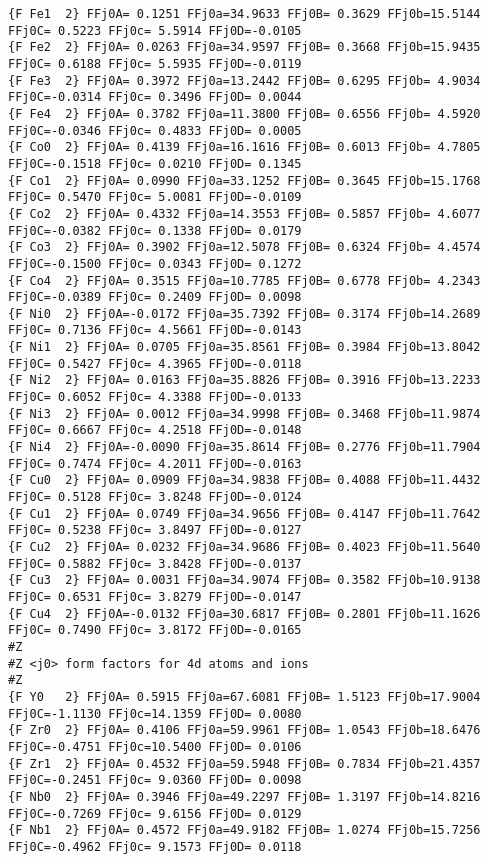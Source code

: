 {\begin{verbatim}
{F Fe1  2} FFj0A= 0.1251 FFj0a=34.9633 FFj0B= 0.3629 FFj0b=15.5144 FFj0C= 0.5223 FFj0c= 5.5914 FFj0D=-0.0105 
{F Fe2  2} FFj0A= 0.0263 FFj0a=34.9597 FFj0B= 0.3668 FFj0b=15.9435 FFj0C= 0.6188 FFj0c= 5.5935 FFj0D=-0.0119 
{F Fe3  2} FFj0A= 0.3972 FFj0a=13.2442 FFj0B= 0.6295 FFj0b= 4.9034 FFj0C=-0.0314 FFj0c= 0.3496 FFj0D= 0.0044 
{F Fe4  2} FFj0A= 0.3782 FFj0a=11.3800 FFj0B= 0.6556 FFj0b= 4.5920 FFj0C=-0.0346 FFj0c= 0.4833 FFj0D= 0.0005 
{F Co0  2} FFj0A= 0.4139 FFj0a=16.1616 FFj0B= 0.6013 FFj0b= 4.7805 FFj0C=-0.1518 FFj0c= 0.0210 FFj0D= 0.1345 
{F Co1  2} FFj0A= 0.0990 FFj0a=33.1252 FFj0B= 0.3645 FFj0b=15.1768 FFj0C= 0.5470 FFj0c= 5.0081 FFj0D=-0.0109 
{F Co2  2} FFj0A= 0.4332 FFj0a=14.3553 FFj0B= 0.5857 FFj0b= 4.6077 FFj0C=-0.0382 FFj0c= 0.1338 FFj0D= 0.0179 
{F Co3  2} FFj0A= 0.3902 FFj0a=12.5078 FFj0B= 0.6324 FFj0b= 4.4574 FFj0C=-0.1500 FFj0c= 0.0343 FFj0D= 0.1272 
{F Co4  2} FFj0A= 0.3515 FFj0a=10.7785 FFj0B= 0.6778 FFj0b= 4.2343 FFj0C=-0.0389 FFj0c= 0.2409 FFj0D= 0.0098 
{F Ni0  2} FFj0A=-0.0172 FFj0a=35.7392 FFj0B= 0.3174 FFj0b=14.2689 FFj0C= 0.7136 FFj0c= 4.5661 FFj0D=-0.0143 
{F Ni1  2} FFj0A= 0.0705 FFj0a=35.8561 FFj0B= 0.3984 FFj0b=13.8042 FFj0C= 0.5427 FFj0c= 4.3965 FFj0D=-0.0118 
{F Ni2  2} FFj0A= 0.0163 FFj0a=35.8826 FFj0B= 0.3916 FFj0b=13.2233 FFj0C= 0.6052 FFj0c= 4.3388 FFj0D=-0.0133 
{F Ni3  2} FFj0A= 0.0012 FFj0a=34.9998 FFj0B= 0.3468 FFj0b=11.9874 FFj0C= 0.6667 FFj0c= 4.2518 FFj0D=-0.0148 
{F Ni4  2} FFj0A=-0.0090 FFj0a=35.8614 FFj0B= 0.2776 FFj0b=11.7904 FFj0C= 0.7474 FFj0c= 4.2011 FFj0D=-0.0163 
{F Cu0  2} FFj0A= 0.0909 FFj0a=34.9838 FFj0B= 0.4088 FFj0b=11.4432 FFj0C= 0.5128 FFj0c= 3.8248 FFj0D=-0.0124 
{F Cu1  2} FFj0A= 0.0749 FFj0a=34.9656 FFj0B= 0.4147 FFj0b=11.7642 FFj0C= 0.5238 FFj0c= 3.8497 FFj0D=-0.0127 
{F Cu2  2} FFj0A= 0.0232 FFj0a=34.9686 FFj0B= 0.4023 FFj0b=11.5640 FFj0C= 0.5882 FFj0c= 3.8428 FFj0D=-0.0137 
{F Cu3  2} FFj0A= 0.0031 FFj0a=34.9074 FFj0B= 0.3582 FFj0b=10.9138 FFj0C= 0.6531 FFj0c= 3.8279 FFj0D=-0.0147 
{F Cu4  2} FFj0A=-0.0132 FFj0a=30.6817 FFj0B= 0.2801 FFj0b=11.1626 FFj0C= 0.7490 FFj0c= 3.8172 FFj0D=-0.0165 
#Z
#Z <j0> form factors for 4d atoms and ions
#Z
{F Y0   2} FFj0A= 0.5915 FFj0a=67.6081 FFj0B= 1.5123 FFj0b=17.9004 FFj0C=-1.1130 FFj0c=14.1359 FFj0D= 0.0080 
{F Zr0  2} FFj0A= 0.4106 FFj0a=59.9961 FFj0B= 1.0543 FFj0b=18.6476 FFj0C=-0.4751 FFj0c=10.5400 FFj0D= 0.0106 
{F Zr1  2} FFj0A= 0.4532 FFj0a=59.5948 FFj0B= 0.7834 FFj0b=21.4357 FFj0C=-0.2451 FFj0c= 9.0360 FFj0D= 0.0098 
{F Nb0  2} FFj0A= 0.3946 FFj0a=49.2297 FFj0B= 1.3197 FFj0b=14.8216 FFj0C=-0.7269 FFj0c= 9.6156 FFj0D= 0.0129 
{F Nb1  2} FFj0A= 0.4572 FFj0a=49.9182 FFj0B= 1.0274 FFj0b=15.7256 FFj0C=-0.4962 FFj0c= 9.1573 FFj0D= 0.0118 

\end{verbatim}}
